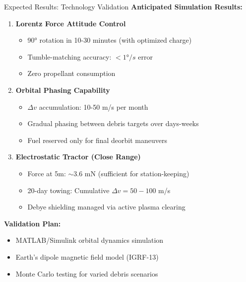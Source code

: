 \documentclass[aspectratio=169]{beamer}
\begin{document}
\begin{frame}{Expected Results: Technology Validation}
\textbf{Anticipated Simulation Results:}

\begin{enumerate}
    \item \textbf{Lorentz Force Attitude Control}
    \begin{itemize}
        \item 90° rotation in 10-30 minutes (with optimized charge)
        \item Tumble-matching accuracy: $< 1°/s$ error
        \item Zero propellant consumption
    \end{itemize}

    \item \textbf{Orbital Phasing Capability}
    \begin{itemize}
        \item $\Delta v$ accumulation: 10-50 m/s per month
        \item Gradual phasing between debris targets over days-weeks
        \item Fuel reserved only for final deorbit maneuvers
    \end{itemize}

    \item \textbf{Electrostatic Tractor (Close Range)}
    \begin{itemize}
        \item Force at 5m: $\sim$3.6 mN (sufficient for station-keeping)
        \item 20-day towing: Cumulative $\Delta v = 50-100$ m/s
        \item Debye shielding managed via active plasma clearing
    \end{itemize}
\end{enumerate}

\vspace{0.3cm}
\textbf{Validation Plan:}
\begin{itemize}
    \item MATLAB/Simulink orbital dynamics simulation
    \item Earth's dipole magnetic field model (IGRF-13)
    \item Monte Carlo testing for varied debris scenarios
\end{itemize}
\end{frame}
\end{document}
